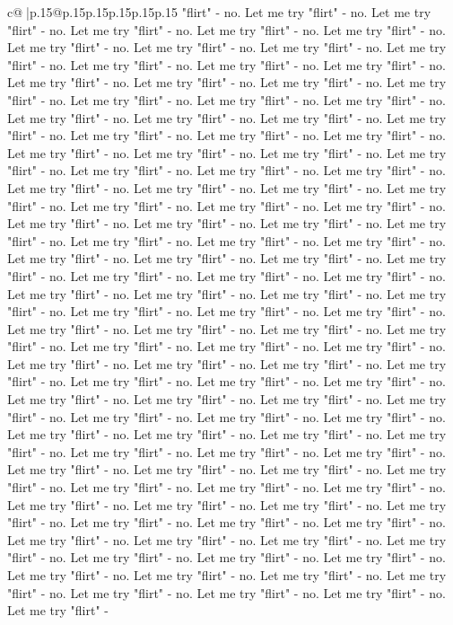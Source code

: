 \documentclass{article}
\begin{document}
{\begin{supertabular}{c@{$\;$}|p{.15\linewidth}@{}p{.15\linewidth}p{.15\linewidth}p{.15\linewidth}p{.15\linewidth}p{.15\linewidth}}
{{{"flirt" {-} no. Let me try "flirt" {-} no. Let me try "flirt" {-} no. Let me try "flirt" {-} no. Let me try "flirt" {-} no. Let me try "flirt" {-} no. Let me try "flirt" {-} no. Let me try "flirt" {-} no. Let me try "flirt" {-} no. Let me try "flirt" {-} no. Let me try "flirt" {-} no. Let me try "flirt" {-} no. Let me try "flirt" {-} no. Let me try "flirt" {-} no. Let me try "flirt" {-} no. Let me try "flirt" {-} no. Let me try "flirt" {-} no. Let me try "flirt" {-} no. Let me try "flirt" {-} no. Let me try "flirt" {-} no. Let me try "flirt" {-} no. Let me try "flirt" {-} no. Let me try "flirt" {-} no. Let me try "flirt" {-} no. Let me try "flirt" {-} no. Let me try "flirt" {-} no. Let me try "flirt" {-} no. Let me try "flirt" {-} no. Let me try "flirt" {-} no. Let me try "flirt" {-} no. Let me try "flirt" {-} no. Let me try "flirt" {-} no. Let me try "flirt" {-} no. Let me try "flirt" {-} no. Let me try "flirt" {-} no. Let me try "flirt" {-} no. Let me try "flirt" {-} no. Let me try "flirt" {-} no. Let me try "flirt" {-} no. Let me try "flirt" {-} no. Let me try "flirt" {-} no. Let me try "flirt" {-} no. Let me try "flirt" {-} no. Let me try "flirt" {-} no. Let me try "flirt" {-} no. Let me try "flirt" {-} no. Let me try "flirt" {-} no. Let me try "flirt" {-} no. Let me try "flirt" {-} no. Let me try "flirt" {-} no. Let me try "flirt" {-} no. Let me try "flirt" {-} no. Let me try "flirt" {-} no. Let me try "flirt" {-} no. Let me try "flirt" {-} no. Let me try "flirt" {-} no. Let me try "flirt" {-} no. Let me try "flirt" {-} no. Let me try "flirt" {-} no. Let me try "flirt" {-} no. Let me try "flirt" {-} no. Let me try "flirt" {-} no. Let me try "flirt" {-} no. Let me try "flirt" {-} no. Let me try "flirt" {-} no. Let me try "flirt" {-} no. Let me try "flirt" {-} no. Let me try "flirt" {-} no. Let me try "flirt" {-} no. Let me try "flirt" {-} no. Let me try "flirt" {-} no. Let me try "flirt" {-} no. Let me try "flirt" {-} no. Let me try "flirt" {-} no. Let me try "flirt" {-} no. Let me try "flirt" {-} no. Let me try "flirt" {-} no. Let me try "flirt" {-} no. Let me try "flirt" {-} no. Let me try "flirt" {-} no. Let me try "flirt" {-} no. Let me try "flirt" {-} no. Let me try "flirt" {-} no. Let me try "flirt" {-} no. Let me try "flirt" {-} no. Let me try "flirt" {-} no. Let me try "flirt" {-} no. Let me try "flirt" {-} no. Let me try "flirt" {-} no. Let me try "flirt" {-} no. Let me try "flirt" {-} no. Let me try "flirt" {-} no. Let me try "flirt" {-} no. Let me try "flirt" {-} no. Let me try "flirt" {-} no. Let me try "flirt" {-} no. Let me try "flirt" {-} no. Let me try "flirt" {-} no. Let me try "flirt" {-} no. Let me try "flirt" {-} no. Let me try "flirt" {-} no. Let me try "flirt" {-} no. Let me try "flirt" {-} no. Let me try "flirt" {-} no. Let me try "flirt" {-} no. Let me try "flirt" {-} no. Let me try "flirt" {-} no. Let me try "flirt" {-} no. Let me try "flirt" {-} no. Let me try "flirt" {-} no. Let me try "flirt" {-} no. Let me try "flirt" {-} no. Let me try "flirt" {-} no. Let me try "flirt" {-} no. Let me try "flirt" {-} no. Let me try "flirt" {-} no. Let me try "flirt" {-} no. Let me try "flirt" {-} no. Let me try "flirt" {-} }}}
\end{supertabular}}
\end{document}
